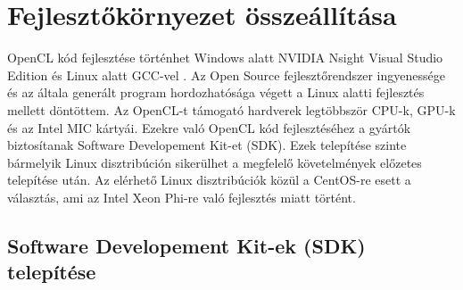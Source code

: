 \section{Fejlesztőkörnyezet összeállítása}

	OpenCL kód fejlesztése történhet Windows alatt NVIDIA Nsight Visual Studio
	Edition \cite{nsight} és Linux alatt GCC-vel \cite{gcc}.
	Az Open Source fejlesztőrendszer ingyenessége és az általa generált program hordozhatósága végett
	a Linux alatti fejlesztés mellett döntöttem. 
	Az OpenCL-t támogató hardverek legtöbbször CPU-k, GPU-k és az Intel MIC \cite{mic} kártyái.
	Ezekre való OpenCL kód fejlesztéséhez a gyártók biztosítanak Software Developement Kit-et (SDK).
	Ezek telepítése szinte bármelyik Linux disztribúción sikerülhet a megfelelő követelmények előzetes telepítése után.
	Az elérhető Linux disztribúciók közül a CentOS-re \cite{centos} esett a választás, ami az Intel Xeon Phi-re való fejlesztés miatt történt.

\subsection*{Software Developement Kit-ek (SDK) telepítése} \label{sect:sdk}

